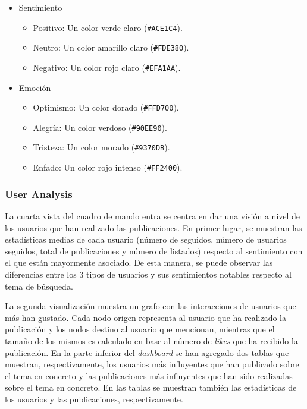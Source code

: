\begin{itemize}
    \item Sentimiento
    \begin{itemize}
        \item Positivo: Un color \colorbox{positive}{verde claro} (\verb|#ACE1C4|).
        \item Neutro: Un color \colorbox{neutral}{amarillo claro} (\verb|#FDE380|).
        \item Negativo: Un color \colorbox{negative}{rojo claro} (\verb|#EFA1AA|).
    \end{itemize}
    
    \item Emoción
    \begin{itemize}
        \item Optimismo: Un color \colorbox{optimism}{dorado} (\verb|#FFD700|).
        \item Alegría: Un color \colorbox{joy}{verdoso} (\verb|#90EE90|).
        \item Tristeza: Un color \colorbox{sadness}{morado} (\verb|#9370DB|).
        \item Enfado: Un color \colorbox{anger}{rojo intenso} (\verb|#FF2400|).
    \end{itemize}
\end{itemize}




\subsubsection{User Analysis}

La cuarta vista del cuadro de mando entra se centra en dar una visión a nivel de los usuarios que han realizado las publicaciones. En primer lugar, se muestran las estadísticas medias de cada usuario (número de seguidos, número de usuarios seguidos, total de publicaciones y número de listados) respecto al sentimiento con el que están mayormente asociado. De esta manera, se puede observar las diferencias entre los 3 tipos de usuarios y sus sentimientos notables respecto al tema de búsqueda.

La segunda visualización muestra un grafo con las interacciones de usuarios que más han gustado. Cada nodo origen representa al usuario que ha realizado la publicación y los nodos destino al usuario que mencionan, mientras que el tamaño de los mismos es calculado en base al número de \textit{likes} que ha recibido la publicación. En la parte inferior del \textit{dashboard} se han agregado dos tablas que muestran, respectivamente, los usuarios más influyentes que han publicado sobre el tema en concreto y las publicaciones más influyentes que han sido realizadas sobre el tema en concreto. En las tablas se muestran también las estadísticas de los usuarios y las publicaciones, respectivamente.

